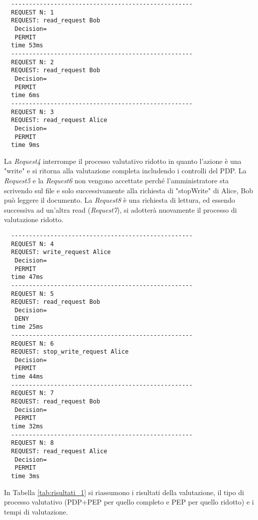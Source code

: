 \begin{verbatim}
  ---------------------------------------------------
  REQUEST N: 1
  REQUEST: read_request Bob
   Decision=
   PERMIT
  time 53ms
  ---------------------------------------------------
  REQUEST N: 2
  REQUEST: read_request Bob
   Decision=
   PERMIT
  time 6ms
  ---------------------------------------------------
  REQUEST N: 3
  REQUEST: read_request Alice
   Decision=
   PERMIT
  time 9ms
\end{verbatim}
La \emph{Request4} interrompe il processo valutativo ridotto in quanto l'azione è una "write" e si ritorna alla valutazione
completa includendo i controlli del \ac{PDP}. La \emph{Request5} e la \emph{Request6} non vengono accettate perché l'amministratore
sta scrivendo sul file e solo successivamente alla richiesta di "stopWrite" di Alice, Bob può leggere il documento.
La \emph{Request8} è una richiesta di lettura, ed essendo successiva ad un'altra read (\emph{Request7}), si adotterà
nuovamente il processo di valutazione ridotto.\par

\begin{verbatim}
  ---------------------------------------------------
  REQUEST N: 4
  REQUEST: write_request Alice
   Decision=
   PERMIT
  time 47ms
  ---------------------------------------------------
  REQUEST N: 5
  REQUEST: read_request Bob
   Decision=
   DENY
  time 25ms
  ---------------------------------------------------
  REQUEST N: 6
  REQUEST: stop_write_request Alice
   Decision=
   PERMIT
  time 44ms
  ---------------------------------------------------
  REQUEST N: 7
  REQUEST: read_request Bob
   Decision=
   PERMIT
  time 32ms
  ---------------------------------------------------
  REQUEST N: 8
  REQUEST: read_request Alice
   Decision=
   PERMIT
  time 3ms
\end{verbatim}
In Tabella \ref{tab:risultati_1} si riassumono i risultati della valutazione, il tipo di processo valutativo
(\ac{PDP}+\ac{PEP} per quello completo e \ac{PEP} per quello ridotto) e i tempi di valutazione.
